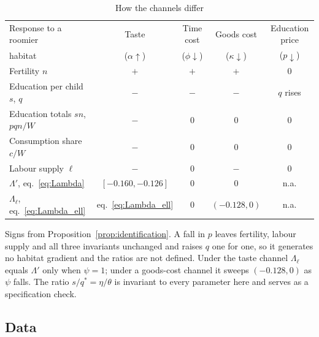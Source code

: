 \documentclass[11pt]{article}
\begin{document}
\begin{table}[h!]\centering
\begin{threeparttable}
\caption{How the channels differ}
\label{tab:fingerprints}
\begin{tabular}{lcccc}
\toprule
Response to a roomier & Taste & Time cost & Goods cost & Education price\\
habitat & ($\alpha\uparrow$) & ($\phi\downarrow$) & ($\kappa\downarrow$) & ($p\downarrow$)\\
\midrule
Fertility $n$                            & $+$ & $+$ & $+$ & $0$\\
Education per child $s$, $q$             & $-$ & $-$ & $-$ & $q$ rises\\
Education totals $sn$, $pqn/W$           & $-$ & $0$ & $0$ & $0$\\
Consumption share $c/W$                  & $-$ & $0$ & $0$ & $0$\\
Labour supply $\ell$                     & $-$ & $0$ & $-$ & $0$\\
\midrule
$\Lambda'$, eq.~\eqref{eq:Lambda}        & $[-0.160,-0.126]$ & $0$ & $0$ & n.a.\\
$\Lambda_\ell$, eq.~\eqref{eq:Lambda_ell}& eq.~\eqref{eq:Lambda_ell} & $0$ & $(-0.128,0)$ & n.a.\\
\bottomrule
\end{tabular}
\begin{tablenotes}\footnotesize
\item Signs from Proposition~\ref{prop:identification}. A fall in $p$ leaves fertility, labour
supply and all three invariants unchanged and raises $q$ one for one, so it generates no habitat
gradient and the ratios are not defined. Under the taste channel $\Lambda_\ell$ equals $\Lambda'$
only when $\psi=1$; under a goods-cost channel it sweeps $(-0.128,0)$ as $\psi$ falls. The ratio
$s/q^{\ast}=\eta/\theta$ is invariant to every parameter here and serves as a specification check.
\end{tablenotes}
\end{threeparttable}
\end{table}

\subsection{Data}
\label{sub:data}
\end{document}
